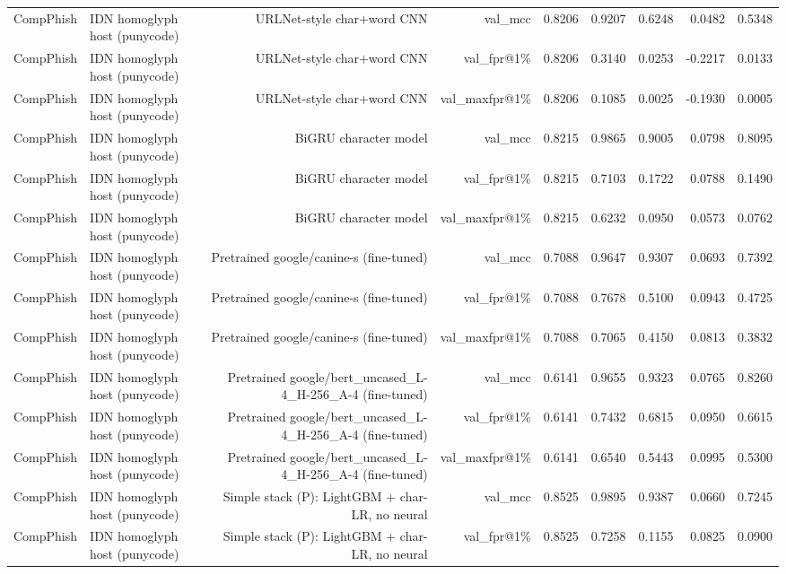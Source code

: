 \begin{table}[t]
\begin{tabular}{llrrrrrrr}
CompPhish & IDN homoglyph host (punycode) & URLNet-style char+word CNN & val\_mcc & 0.8206 & 0.9207 & 0.6248 & 0.0482 & 0.5348 \\
CompPhish & IDN homoglyph host (punycode) & URLNet-style char+word CNN & val\_fpr@1\% & 0.8206 & 0.3140 & 0.0253 & -0.2217 & 0.0133 \\
CompPhish & IDN homoglyph host (punycode) & URLNet-style char+word CNN & val\_maxfpr@1\% & 0.8206 & 0.1085 & 0.0025 & -0.1930 & 0.0005 \\
CompPhish & IDN homoglyph host (punycode) & BiGRU character model & val\_mcc & 0.8215 & 0.9865 & 0.9005 & 0.0798 & 0.8095 \\
CompPhish & IDN homoglyph host (punycode) & BiGRU character model & val\_fpr@1\% & 0.8215 & 0.7103 & 0.1722 & 0.0788 & 0.1490 \\
CompPhish & IDN homoglyph host (punycode) & BiGRU character model & val\_maxfpr@1\% & 0.8215 & 0.6232 & 0.0950 & 0.0573 & 0.0762 \\
CompPhish & IDN homoglyph host (punycode) & Pretrained google/canine-s (fine-tuned) & val\_mcc & 0.7088 & 0.9647 & 0.9307 & 0.0693 & 0.7392 \\
CompPhish & IDN homoglyph host (punycode) & Pretrained google/canine-s (fine-tuned) & val\_fpr@1\% & 0.7088 & 0.7678 & 0.5100 & 0.0943 & 0.4725 \\
CompPhish & IDN homoglyph host (punycode) & Pretrained google/canine-s (fine-tuned) & val\_maxfpr@1\% & 0.7088 & 0.7065 & 0.4150 & 0.0813 & 0.3832 \\
CompPhish & IDN homoglyph host (punycode) & Pretrained google/bert\_uncased\_L-4\_H-256\_A-4 (fine-tuned) & val\_mcc & 0.6141 & 0.9655 & 0.9323 & 0.0765 & 0.8260 \\
CompPhish & IDN homoglyph host (punycode) & Pretrained google/bert\_uncased\_L-4\_H-256\_A-4 (fine-tuned) & val\_fpr@1\% & 0.6141 & 0.7432 & 0.6815 & 0.0950 & 0.6615 \\
CompPhish & IDN homoglyph host (punycode) & Pretrained google/bert\_uncased\_L-4\_H-256\_A-4 (fine-tuned) & val\_maxfpr@1\% & 0.6141 & 0.6540 & 0.5443 & 0.0995 & 0.5300 \\
CompPhish & IDN homoglyph host (punycode) & Simple stack (P): LightGBM + char-LR, no neural & val\_mcc & 0.8525 & 0.9895 & 0.9387 & 0.0660 & 0.7245 \\
CompPhish & IDN homoglyph host (punycode) & Simple stack (P): LightGBM + char-LR, no neural & val\_fpr@1\% & 0.8525 & 0.7258 & 0.1155 & 0.0825 & 0.0900 \\

\end{tabular}
\end{table}
